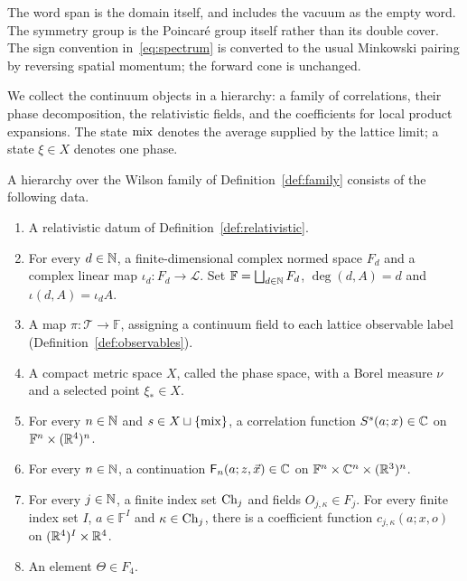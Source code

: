 The word span is the domain itself, and includes the vacuum as the empty word.
The symmetry group is the Poincar\'e group itself rather than its double cover.
The sign convention in~\eqref{eq:spectrum} is converted to the usual Minkowski pairing by reversing spatial momentum; the forward cone is unchanged.

We collect the continuum objects in a hierarchy: a family of correlations, their phase decomposition, the relativistic fields, and the coefficients for local product expansions.
The state $\mathrm{mix}$ denotes the average supplied by the lattice limit; a state $\xi\in X$ denotes one phase.

\begin{definition}[Hierarchy]\label{def:hierarchy}
A hierarchy over the Wilson family of Definition~\ref{def:family} consists of the following data.
\begin{enumerate}[label=\textup{H\arabic*.},ref=H\arabic*]
\item\label{hierarchy:1} A relativistic datum of Definition~\ref{def:relativistic}.
\item\label{hierarchy:2} For every $d\in\mathbb N$, a finite-dimensional complex normed space $F_d$ and a complex linear map $\iota_d:F_d\to\mathcal L$.
Set $\mathbb F=\bigsqcup_{d\in\mathbb N}F_d$, $\deg(d,A)=d$ and $\iota(d,A)=\iota_d A$.
\item\label{hierarchy:3} A map $\pi:\mathcal T\to\mathbb F$, assigning a continuum field to each lattice observable label (Definition~\ref{def:observables}).
\item\label{hierarchy:4} A compact metric space $X$, called the phase space, with a Borel measure $\nu$ and a selected point $\xi_*\in X$.
\item\label{hierarchy:5} For every $n\in\mathbb N$ and $s\in X\sqcup\{\mathrm{mix}\}$, a correlation function $S^s(a;x)\in\mathbb C$ on $\mathbb F^n\times(\mathbb R^4)^n$.
\item\label{hierarchy:6} For every $n\in\mathbb N$, a continuation $\mathsf F_n(a;z,\vec x)\in\mathbb C$ on $\mathbb F^n\times\mathbb C^n\times(\mathbb R^3)^n$.
\item\label{hierarchy:7} For every $j\in\mathbb N$, a finite index set $\operatorname{Ch}_{j}$ and fields $O_{j,\kappa}\in F_j$.
For every finite index set $I$, $a\in\mathbb F^I$ and $\kappa\in\operatorname{Ch}_{j}$, there is a coefficient function $c_{j,\kappa}(a;x,o)$ on $(\mathbb R^4)^I\times\mathbb R^4$.
\item\label{hierarchy:8} An element $\Theta\in F_4$.
\end{enumerate}
\end{definition}

